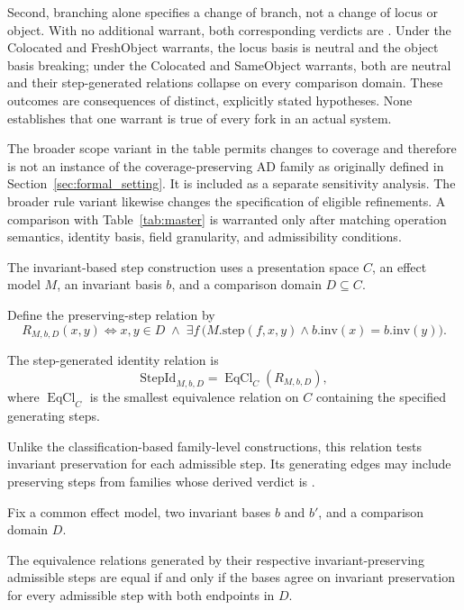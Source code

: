 Second, branching alone specifies a change of branch, not a change of
locus or object.
With no additional warrant, both corresponding verdicts are \MIX.
Under the Colocated and FreshObject warrants,
the locus basis is neutral and the object basis breaking;
under the Colocated and SameObject warrants,
both are neutral and their step-generated relations
collapse on every comparison domain.
These outcomes are consequences of distinct, explicitly stated
hypotheses.
None establishes that one warrant is true of every fork
in an actual system.

The broader scope variant in the table permits changes to coverage and
therefore is not an instance of the coverage-preserving AD family as
originally defined in Section~\ref{sec:formal_setting}.
It is included as a separate sensitivity analysis.
The broader rule variant likewise changes the specification of eligible refinements.
A comparison with Table~\ref{tab:master} is warranted only after
matching operation semantics, identity basis, field granularity, and
admissibility conditions.

The invariant-based step construction uses a presentation space $C$,
an effect model $M$, an invariant basis $b$, and a comparison domain
$D\subseteq C$.

Define the preserving-step relation by
\[
  R_{M,b,D}(x,y)
  \iff
  x,y\in D
  \;\land\;
  \exists f\,
  \bigl(
  M.\mathrm{step}(f,x,y)
  \land
  b.\mathrm{inv}(x)=b.\mathrm{inv}(y)
  \bigr).
\]

The step-generated identity relation is
\[
  \mathrm{StepId}_{M,b,D}
  =
  \operatorname{EqCl}_{C}(R_{M,b,D}),
\]
where $\operatorname{EqCl}_{C}$ is the smallest equivalence
relation on $C$ containing the specified generating steps.

Unlike the classification-based family-level constructions,
this relation tests invariant preservation for each admissible
step. Its generating edges may include preserving steps from
families whose derived verdict is \MIX{}.

\begin{theorem}
  \label{se200.thm.StepIdentityCollapse}
  Fix a common effect model, two invariant bases $b$ and $b'$,
  and a comparison domain $D$.

  The equivalence relations generated by their respective
  invariant-preserving admissible steps are equal if and only if
  the bases agree on invariant preservation for every admissible
  step with both endpoints in $D$.
\end{theorem}


